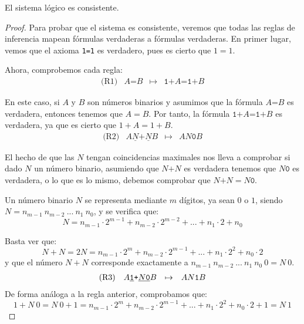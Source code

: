 \pagebreak

\begin{proposicion}\label{prop:ap-cons}
El sistema lógico  es consistente.
\end{proposicion}
\begin{proof}
Para probar que el sistema es consistente, veremos que todas las reglas de inferencia mapean fórmulas verdaderas a fórmulas verdaderas. En primer lugar, vemos que el axioma \texttt{1=1} es verdadero, pues es cierto que $1=1$.

Ahora, comprobemos cada regla:
$$
    \begin{matrix}
    \text{(R1)} & A\texttt{=}B & \mapsto & \texttt{1+}A\texttt{=}\texttt{1+}B 
    \end{matrix}
$$

En este caso, si $A$ y $B$ son números binarios y asumimos que la fórmula $A\texttt{=}B$ es verdadera, entonces tenemos que $A=B$. Por tanto, la fórmula $\texttt{1+}A\texttt{=1+}B$ es verdadera, ya que es cierto que $1+A=1+B$.
$$
    \begin{matrix}
    \text{(R2)} & A\underline{N}\texttt{+}\underline{N}B & \mapsto & AN\texttt{0}B
    \end{matrix}
$$

El hecho de que las $N$ tengan coincidencias maximales nos lleva a comprobar si dado $N$ un número binario, asumiendo que $N\texttt{+}N$ es verdadera tenemos que $N\texttt{0}$ es verdadera, o lo que es lo mismo, debemos comprobar que $N\texttt{+}N=N\texttt{0}$.

Un número binario $N$ se representa mediante $m$ dígitos, ya sean $0$ o $1$, siendo \linebreak $N=n_{m-1}\:n_{m-2}\:...\:n_1\:n_0$, y se verifica que:
$$N = n_{m-1}\cdot2^{m-1} + n_{m-2}\cdot2^{m-2}+...+n_1\cdot2+n_0$$

Basta ver que:
$$N+N=2N=n_{m-1}\cdot2^{m} + n_{m-2}\cdot2^{m-1}+...+n_1\cdot2^2+n_0\cdot 2$$
y que el número $N+N$ corresponde exactamente a $n_{m-1}\:n_{m-2}\:...\:n_1\:n_0\:0=N\:0$.
$$
    \begin{matrix}
    \text{(R3)} & A\texttt{\underline{1}+}\underline{N\texttt{0}}B & \mapsto & AN\texttt{1}B
    \end{matrix}
$$
De forma análoga a la regla anterior, comprobamos que:
$$1+N\:0=N\:0+1=n_{m-1}\cdot2^{m} + n_{m-2}\cdot2^{m-1}+...+n_1\cdot2^2+n_0\cdot 2+1=N\:1$$
\end{proof}

